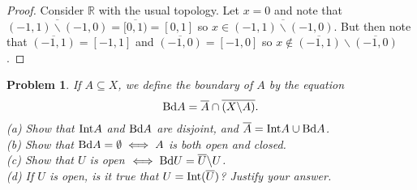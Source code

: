 \documentclass{article}
\newtheorem{problem}{Problem}
\newcommand{\bd}{\textup{Bd}}
\newcommand{\intr}{\textup{Int}}
\begin{document}
\begin{proof}
Consider $\mathbb{R}$ with the usual topology. Let $x = 0$ and note that $\overline{(-1,1) \backslash (-1,0)} = \overline{[0,1)} = [0,1]$ so $x \in \overline{(-1,1) \backslash (-1,0)}$. But then note that $\overline{(-1,1)} = [-1,1]$ and $\overline{(-1,0)} = [-1,0]$ so $x \notin \overline{(-1,1)} \backslash \overline{(-1,0)}$.
\end{proof}

\begin{problem}
If $A \subseteq X$, we define the \emph{boundary} of $A$ by the equation
\[
\bd A = \overline{A} \cap \overline{(X \backslash A)}.
\]
(a) Show that $\intr A$ and $\bd A$ are disjoint, and $\overline{A} = \intr A \cup \bd A$.\\
(b) Show that $\bd A = \emptyset \iff A$ is both open and closed.\\
(c) Show that $U$ is open $\iff \bd U = \overline{U} \backslash U$.\\
(d) If $U$ is open, is it true that $U = \intr(\overline{U})$? Justify your answer.
\end{problem}
\end{document}
